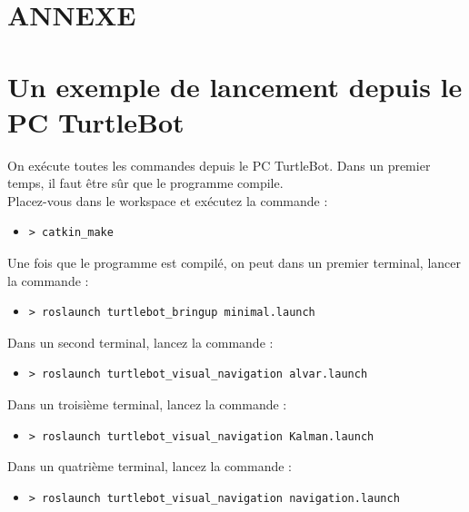 \documentclass[10pt,a4paper]{article}
\begin{document}
\newpage
\section*{ANNEXE}

\section{Un exemple de lancement depuis le PC TurtleBot}

On exécute toutes les commandes depuis le PC TurtleBot.
Dans un premier temps, il faut être sûr que le programme compile. \\
Placez-vous dans le workspace et exécutez la commande :
\begin{itemize}
\item[] \begin{verbatim}> catkin_make \end{verbatim}
\end{itemize}

Une fois que le programme est compilé, on peut dans un premier terminal, lancer la commande :
\begin{itemize}
\item[] \begin{verbatim}> roslaunch turtlebot_bringup minimal.launch \end{verbatim}
\end{itemize}

Dans un second terminal, lancez la commande :
\begin{itemize}
\item[] \begin{verbatim}> roslaunch turtlebot_visual_navigation alvar.launch \end{verbatim}
\end{itemize}

Dans un troisième terminal, lancez la commande :
\begin{itemize}
\item[] \begin{verbatim}> roslaunch turtlebot_visual_navigation Kalman.launch \end{verbatim}
\end{itemize}

Dans un quatrième terminal, lancez la commande :
\begin{itemize}
\item[] \begin{verbatim}> roslaunch turtlebot_visual_navigation navigation.launch \end{verbatim}
\end{itemize}
\end{document}
